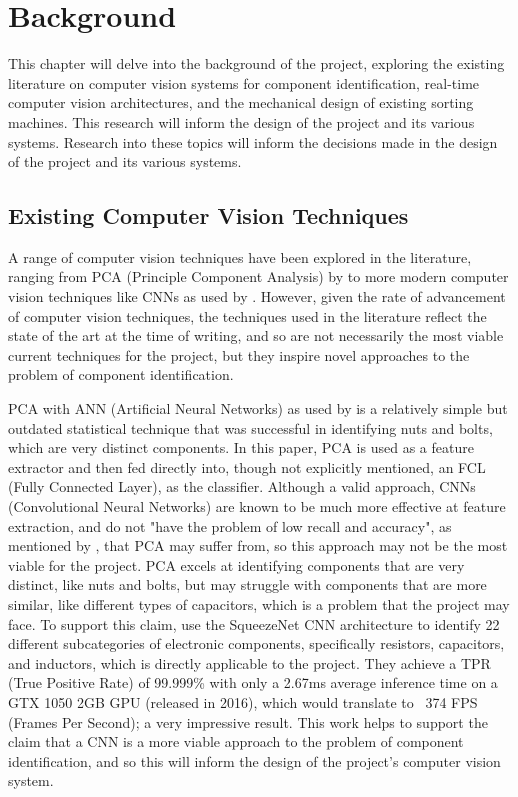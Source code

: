 \section{Background}
\label{sec:background}
This chapter will delve into the background of the project, exploring the existing literature on computer vision systems for component identification, real-time computer vision architectures, and the mechanical design of existing sorting machines. This research will inform the design of the project and its various systems. Research into these topics will inform the decisions made in the design of the project and its various systems.

\subsection{Existing Computer Vision Techniques}
A range of computer vision techniques have been explored in the literature, ranging from PCA (Principle Component Analysis) by \citet{Dhenge2013MechanicalNS} to more modern computer vision techniques like CNNs as used by \citet{Xu2020,s22239079}. However, given the rate of advancement of computer vision techniques, the techniques used in the literature reflect the state of the art at the time of writing, and so are not necessarily the most viable current techniques for the project, but they inspire novel approaches to the problem of component identification.

PCA with ANN (Artificial Neural Networks) as used by \citet{Dhenge2013MechanicalNS} is a relatively simple but outdated statistical technique that was successful in identifying nuts and bolts, which are very distinct components. In this paper, PCA is used as a feature extractor and then fed directly into, though not explicitly mentioned, an FCL (Fully Connected Layer), as the classifier. Although a valid approach, CNNs (Convolutional Neural Networks) are known to be much more effective at feature extraction, and do not "have the problem of low recall and accuracy", as mentioned by \citet{Xu2020}, that PCA may suffer from, so this approach may not be the most viable for the project. PCA excels at identifying components that are very distinct, like nuts and bolts, but may struggle with components that are more similar, like different types of capacitors, which is a problem that the project may face. To support this claim, \citet{Xu2020} use the SqueezeNet CNN architecture to identify 22 different subcategories of electronic components, specifically resistors, capacitors, and inductors, which is directly applicable to the project. They achieve a TPR (True Positive Rate) of 99.999\% with only a 2.67ms average inference time on a GTX 1050 2GB GPU (released in 2016), which would translate to ~374 FPS (Frames Per Second); a very impressive result. This work helps to support the claim that a CNN is a more viable approach to the problem of component identification, and so this will inform the design of the project's computer vision system.

